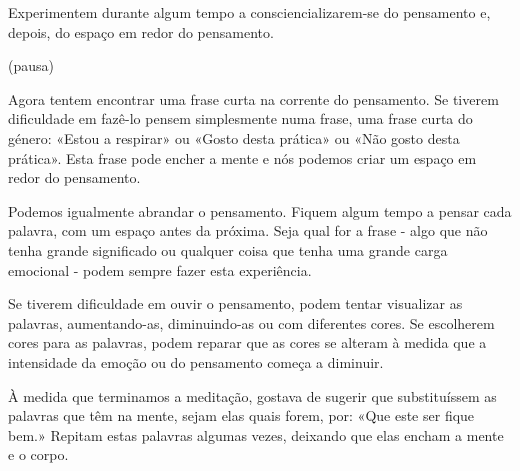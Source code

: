 Experimentem durante algum tempo a consciencializarem-se do pensamento
e, depois, do espaço em redor do pensamento.

(pausa)

Agora tentem encontrar uma frase curta na corrente do pensamento. Se
tiverem dificuldade em fazê-lo pensem simplesmente numa frase, uma frase
curta do género: «Estou a respirar» ou «Gosto desta prática» ou «Não
gosto desta prática». Esta frase pode encher a mente e nós podemos criar
um espaço em redor do pensamento.

Podemos igualmente abrandar o pensamento. Fiquem algum tempo a pensar
cada palavra, com um espaço antes da próxima. Seja qual for a frase -
algo que não tenha grande significado ou qualquer coisa que tenha uma
grande carga emocional - podem sempre fazer esta experiência.

Se tiverem dificuldade em ouvir o pensamento, podem tentar visualizar as
palavras, aumentando-as, diminuindo-as ou com diferentes cores. Se
escolherem cores para as palavras, podem reparar que as cores se alteram
à medida que a intensidade da emoção ou do pensamento começa a diminuir.

À medida que terminamos a meditação, gostava de sugerir que
substituíssem as palavras que têm na mente, sejam elas quais forem, por:
«Que este ser fique bem.» Repitam estas palavras algumas vezes, deixando
que elas encham a mente e o corpo.

